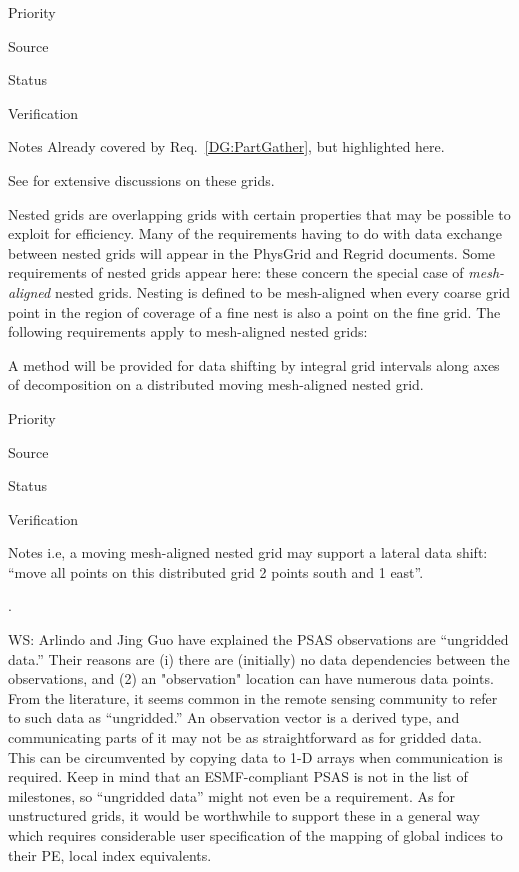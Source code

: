 \begin{reqlist}
\item[Priority]
\item[Source]
\item[Status]
\item[Verification]
\item[Notes] Already covered by Req.~\ref{DG:PartGather}, but
  highlighted here.
\end{reqlist}



See \cite{art:heikes+:geodesic,art:majewski+:gme} for extensive
discussions on these grids.



Nested grids are overlapping grids with certain properties that may be
possible to exploit for efficiency. Many of the requirements having to
do with data exchange between nested grids will appear in the PhysGrid
and Regrid documents. Some requirements of nested grids appear here:
these concern the special case of \emph{mesh-aligned} nested
grids. Nesting is defined to be mesh-aligned when every coarse grid
point in the region of coverage of a fine nest is also a point on the
fine grid. The following requirements apply to mesh-aligned nested
grids:


A method will be provided for data shifting by integral grid intervals
along axes of decomposition on a distributed moving mesh-aligned
nested grid.

\begin{reqlist}
\item[Priority]
\item[Source]
\item[Status]
\item[Verification]
\item[Notes] i.e, a moving mesh-aligned nested grid may support a
  lateral data shift: ``move all points on this distributed grid 2
  points south and 1 east''.
\end{reqlist}

 \label{DG:Unstructured}.

WS: Arlindo and Jing Guo have explained the PSAS
observations are ``ungridded data.'' Their reasons are (i) there are
(initially) no data dependencies between the observations, and (2) an
"observation" location can have numerous data points.  From the
literature, it seems common in the remote sensing community to refer
to such data as ``ungridded.''  An observation vector is a derived
type, and communicating parts of it may not be as straightforward as for
gridded data.  This can be circumvented by copying data to 1-D arrays
when communication is required.  Keep in mind that an ESMF-compliant
PSAS is not in the list of milestones, so ``ungridded data'' might not
even be a requirement.  As for unstructured grids, it would be
worthwhile to support these in a general way which requires
considerable user specification of the mapping of global indices to
their PE, local index equivalents.


